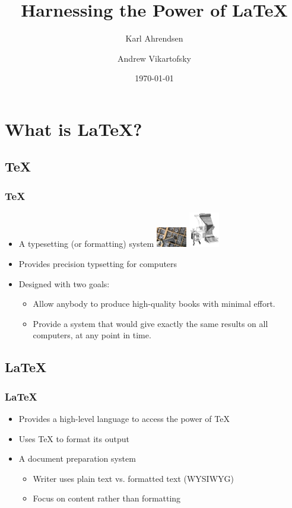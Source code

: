\documentclass{beamer}
\title{Harnessing the Power of \LaTeX}
\author{Karl Ahrendsen \and Andrew Vikartofsky}
\institute{University of Nebraska-Lincoln}
\date{\today}
\begin{document}
\begin{frame}
	\titlepage
\end{frame}

\section{What is \LaTeX?}
\subsection{\TeX}
\begin{frame}
	\frametitle{\TeX}
    \begin{itemize}
        \item A typesetting (or formatting) system
				\includegraphics[width=50px]{img/metalWords.jpg}
				\includegraphics[width=50px]{img/typesettingMachine.png}
        \item Provides precision typsetting for computers
		\item Designed with two goals:
            \begin{itemize}
                \item Allow anybody to produce high-quality books with minimal effort.
                \item Provide a system that would give exactly the same results on all computers, at any point in time.
			\end{itemize}
    \end{itemize}
\end{frame}
\subsection{\LaTeX}
\begin{frame}
    \frametitle{\LaTeX}
    \begin{itemize}
        \item Provides a high-level language to access the power of TeX
        \item Uses TeX to format its output
        \item A document preparation system
			\begin{itemize}
				\item Writer uses plain text vs. formatted text (WYSIWYG)
				\item Focus on content rather than formatting
			\end{itemize}
    \end{itemize}
\end{frame}
\end{document}
